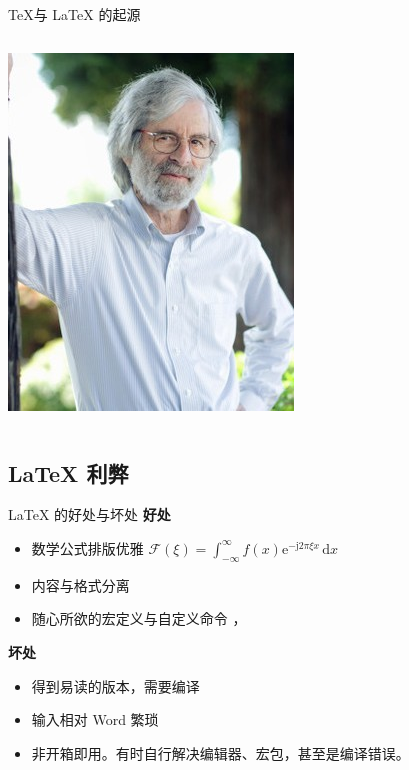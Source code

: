 \begin{frame}[fragile]{\TeX 与 \LaTeX{} 的起源}
\begin{columns}[T]
    \hspace{-10mm} \includegraphics[width=\textwidth]{Lamport.jpg}

  \end{columns}
\end{frame}

\subsection{\LaTeX{} 利弊}

\begin{frame}[fragile]{\LaTeX{} 的好处与坏处}
    \textbf{好处}
    \begin{itemize}
        \item 数学公式排版优雅 \quad $\mathcal{F}(\xi)=\int_{-\infty}^{\infty} f(x)\mathrm{e}^{-\mathrm{j}2\pi \xi x}\,\mathrm{d}x$
        \item 内容与格式分离
        \item 随心所欲的宏定义与自定义命令 ，
    \end{itemize}

    \vspace{2em}
    \textbf{坏处}
    \begin{itemize}
        \item 得到易读的版本，需要编译
        \item 输入相对 Word 繁琐
        \item 非开箱即用。有时自行解决编辑器、宏包，甚至是编译错误。
    \end{itemize}

\end{frame}

